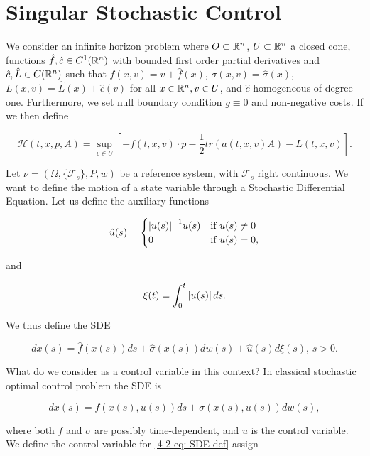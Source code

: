 \section{Singular Stochastic Control}

We consider an infinite horizon problem where $O\subset\mathbb{R}^n$, $U\subset\mathbb{R}^n$ a closed cone, functions $\hat{f},\hat{c}\in C^1(\mathbb{R}^n)$ with bounded first order partial derivatives and $\hat{c},\hat{L}\in C(\mathbb{R}^n)$ such that $f(x,v)=v+\hat{f}(x)$, $\sigma(x,v)=\hat{\sigma}(x)$, $L(x,v)=\hat{L}(x)+\hat{c}(v)$ for all $x\in\mathbb{R}^n,v\in U$, and $\hat{c}$ homogeneous of degree one. Furthermore, we set null boundary condition $g\equiv 0$ and non-negative costs. If we then define

\begin{equation}
    \mathcal{H}(t,x,p,A) = \sup_{v\in U}\left[-f(t,x,v)\cdot p - \frac{1}{2}tr(a(t,x,v)A) - L(t,x,v)\right].
\end{equation}

Let $\nu=(\Omega, \{\mathcal{F}_s\}, P, w)$ be a reference system, with $\mathcal{F}_s$ right continuous. We want to define the motion of a state variable through a Stochastic Differential Equation. 
Let us define the auxiliary functions

\begin{equation}
    \hat{u}(s) = \begin{cases}
        \abs{u(s)}^{-1}u(s) & \text{if } u(s) \neq 0 \\
        0 & \text{if } u(s) = 0,
    \end{cases}
\end{equation}

and

\begin{equation}
    \xi(t) = \int_0^t \abs{u(s)} \,ds.
\end{equation}

We thus define the SDE

\begin{equation}\label{4-2-eq: SDE def}
    dx(s) = \hat{f}(x(s))ds + \hat{\sigma}(x(s))dw(s) + \hat{u}(s)d\xi(s),\,s>0.
\end{equation}

What do we consider as a control variable in this context? In classical stochastic optimal control problem the SDE is

\[dx(s) = f(x(s),u(s))ds + \sigma(x(s),u(s))dw(s),\]

where both $f$ and $\sigma$ are possibly time-dependent, and $u$ is the control variable. We define the control variable for \eqref{4-2-eq: SDE def} assign

